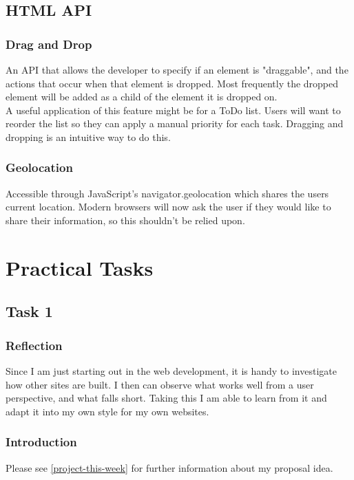\documentclass[portfolio.tex.tex]{subfiles}
\begin{document}
			\subsection{HTML API}
				\subsubsection{Drag and Drop}
					An API that allows the developer to specify if an element is "draggable", and the actions that occur when that element is dropped. Most frequently the dropped element will be added as a child of the element it is dropped on. \autocite{w3-drag}\\

					A useful application of this feature might be for a ToDo list. Users will want to reorder the list so they can apply a manual priority for each task. Dragging and dropping is an intuitive way to do this.  \\

				\subsubsection{Geolocation}
					Accessible through JavaScript's navigator.geolocation which shares the users current location. Modern browsers will now ask the user if they would like to share their information, so this shouldn't be relied upon. \autocite{w3-geo}
		\section{Practical Tasks}
			\subsection{Task 1}
				\subsubsection{Reflection}
					Since I am just starting out in the web development, it is handy to investigate how other sites are built. I then can observe what works well from a user perspective, and what falls short. Taking this I am able to learn from it and adapt it into my own style for my own websites.

				\subsubsection{Introduction}
					Please see \ref{project-this-week} for further information about my proposal idea.
\end{document}
